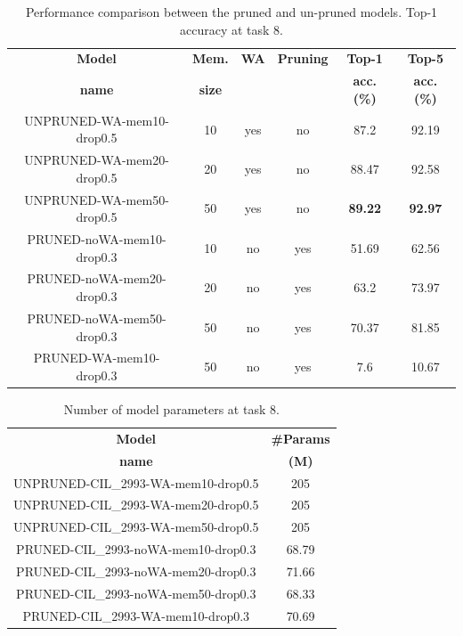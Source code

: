 \begin{table}[H]
    \centering
    \begin{tabular}{c|c|c|c|c|c}
        \hline
        \textbf{Model} &
        \textbf{Mem.} &
        \textbf{WA} &
        \textbf{Pruning} &
        \textbf{Top-1} & 
        \textbf{Top-5} \\
        \textbf{name} &
        \textbf{size} &
        &
        &
        \textbf{acc. (\%)} & 
        \textbf{acc. (\%)} \\
        \hline
        \hline
UNPRUNED-WA-mem10-drop0.5&10&yes&no&87.2&92.19\\
UNPRUNED-WA-mem20-drop0.5&20&yes&no&88.47&92.58\\
UNPRUNED-WA-mem50-drop0.5&50&yes&no&\textbf{89.22}&\textbf{92.97}\\
\hline
PRUNED-noWA-mem10-drop0.3&10&no&yes&51.69&62.56\\
PRUNED-noWA-mem20-drop0.3&20&no&yes&63.2&73.97\\
PRUNED-noWA-mem50-drop0.3&50&no&yes&70.37&81.85\\
\hline
PRUNED-WA-mem10-drop0.3&50&no&yes&7.6&10.67\\
\hline
\end{tabular}
\caption{Performance comparison between the pruned and un-pruned models. Top-1 accuracy at task 8.}
    \label{table:exp7}
\end{table}


\begin{table}[H]
    \centering
    \begin{tabular}{c|c}
        \hline
        \textbf{Model} &
        \textbf{\#Params} \\
        \textbf{name} &
        \textbf{(M)} \\
        \hline
        \hline
UNPRUNED-CIL\_2993-WA-mem10-drop0.5&205\\
UNPRUNED-CIL\_2993-WA-mem20-drop0.5&205\\
UNPRUNED-CIL\_2993-WA-mem50-drop0.5&205\\
\hline
PRUNED-CIL\_2993-noWA-mem10-drop0.3&68.79\\
PRUNED-CIL\_2993-noWA-mem20-drop0.3&71.66\\
PRUNED-CIL\_2993-noWA-mem50-drop0.3&68.33\\
\hline
PRUNED-CIL\_2993-WA-mem10-drop0.3&70.69\\
        \hline
    \end{tabular}
	\caption{Number of model parameters at task 8.}%
    \label{table:exp7-params}
\end{table}

